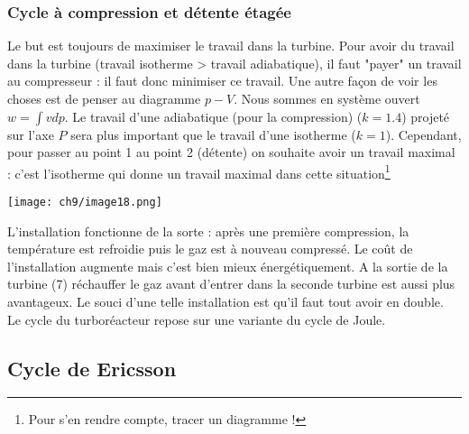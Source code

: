 	
		\subsubsection{Cycle à	compression	et détente	étagée}
		Le but est toujours de maximiser le travail dans la turbine. Pour avoir du travail 
		dans la turbine (travail isotherme > travail adiabatique), il faut "payer" un travail 
		au compresseur : il faut donc minimiser ce travail. Une autre façon de voir les choses 
		est de penser au diagramme $p-V$. Nous sommes en système ouvert $w = \int vdp$. Le travail 
		d'une adiabatique (pour la compression) ($k=1.4$)	 projeté sur l'axe $P$ sera plus 
		important que le travail d'une isotherme ($k=1$). Cependant, pour passer au point 1 au 
		point 2 (détente) on souhaite avoir un travail maximal : c'est l'isotherme qui donne 
		un travail maximal dans cette situation\footnote{Pour s'en rendre compte, tracer un 
		diagramme !}
		
				\begin{center}
		\texttt{[image: ch9/image18.png]}
		\end{center}			
		
		L'installation fonctionne de la sorte : après une première compression, la température 
		est refroidie puis le gaz est à nouveau compressé. Le coût de l'installation augmente 
		mais c'est bien mieux énergétiquement. A la sortie de la turbine (7) réchauffer le gaz
		avant d'entrer dans la seconde turbine est aussi plus avantageux. Le souci d'une telle 
		installation est qu'il faut tout avoir en double.\\
		Le cycle du turboréacteur repose sur une variante du cycle de Joule.
		
	\subsection{Cycle de Ericsson}
	
	
	
	
	
	
	
	
	
	
	